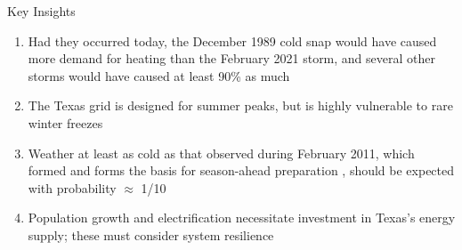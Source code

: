 \begin{block}{Key Insights}
    \begin{enumerate}
        \item Had they occurred today, the December 1989 cold snap would have caused more demand for heating than the February 2021 storm, and several other storms would have caused at least 90\% as much
        \item The Texas grid is designed for summer peaks, but is highly vulnerable to rare winter freezes
        \item Weather at least as cold as that observed during February 2011, which formed and forms the basis for season-ahead preparation \cite{ercotpublic_sarawinter:2020,ercot_sarawinter:2021}, should be expected with probability $\approx$ 1/10
        \item Population growth and electrification necessitate investment in Texas's energy supply; these must consider system resilience
    \end{enumerate}
\end{block}